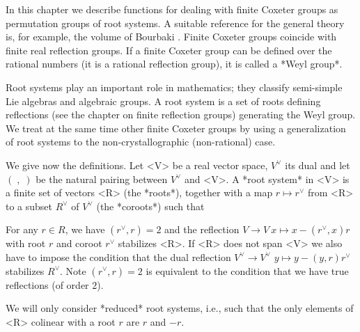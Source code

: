 
In  this  chapter  we  describe  functions  for dealing with finite Coxeter
groups  as permutation groups of root systems. A suitable reference for the
general theory is, for example, the volume of Bourbaki \cite{Bou68}. Finite
Coxeter  groups coincide  with finite  real reflection  groups. If a finite
Coxeter  group can be defined  over the rational numbers  (it is a rational
reflection group), it is called a *Weyl group*.

Root   systems  play  an  important  role  in  mathematics;  they  classify
semi-simple  Lie algebras and algebraic  groups. A root system  is a set of
roots  defining reflections (see  the chapter on  finite reflection groups)
generating  the Weyl group. We treat at  the same time other finite Coxeter
groups by using a generalization of root systems to the
non-crystallographic (non-rational) case.

We  give now the definitions. Let <V>  be a real vector space, $V^\vee$ its
dual  and let $(\;,\;)$ be the natural  pairing between $V^\vee$ and <V>. A
*root system* in <V> is a finite set of vectors <R> (the *roots*), together
with a map $r\mapsto r^\vee$ from <R> to a subset $R^\vee$ of $V^\vee$ (the
*coroots*) such that\:

For  any  $r\in  R$,  we  have  $(r^\vee,r)=2$ and the reflection $V\to V\:
x\mapsto x- (r^\vee,x) r$ with root $r$ and coroot $r^\vee$ stabilizes <R>.
If <R> does not span <V> we also have to impose the condition that the dual
reflection   $V^\vee  \rightarrow  V^\vee$\:  $y  \mapsto  y  -(y,r)r^\vee$
stabilizes  $R^\vee$. Note  $(r^\vee,r)=2$ is  equivalent to  the condition
that we have true reflections (of order $2$).

We will only  consider *reduced* root systems, i.e., such  that the only
elements of <R> colinear with a root $r$ are $r$ and $-r$.

